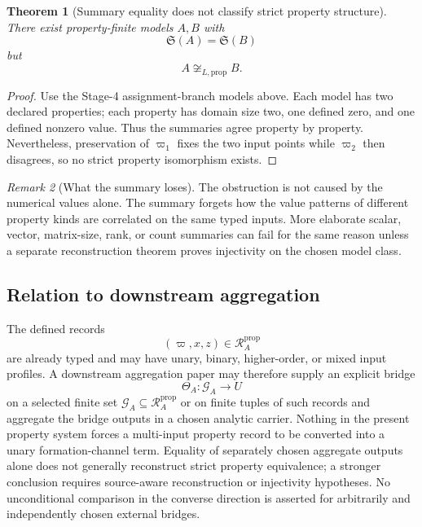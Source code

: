 \documentclass[11pt]{article}
\newcommand{\PropRec}{\mathcal R^{\mathrm{prop}}}
\newtheorem{theorem}{Theorem}[section]
\theoremstyle{definition}
\theoremstyle{remark}
\newtheorem{remark}[theorem]{Remark}
\begin{document}
\begin{theorem}[Summary equality does not classify strict property structure]
\label{thm:compression}
There exist property-finite models \(A,B\) with
\[
\mathfrak S(A)=\mathfrak S(B)
\]
but
\[
A\not\cong_{L,\mathrm{prop}}B.
\]
\end{theorem}

\begin{proof}
Use the Stage-4 assignment-branch models above.
Each model has two declared properties; each property has domain size two, one defined zero, and one defined nonzero value.
Thus the summaries agree property by property.
Nevertheless, preservation of \(\varpi_1\) fixes the two input points while \(\varpi_2\) then disagrees, so no strict property isomorphism exists.
\end{proof}

\begin{remark}[What the summary loses]
The obstruction is not caused by the numerical values alone.
The summary forgets how the value patterns of different property kinds are correlated on the same typed inputs.
More elaborate scalar, vector, matrix-size, rank, or count summaries can fail for the same reason unless a separate reconstruction theorem proves injectivity on the chosen model class.
\end{remark}

\subsection{Relation to downstream aggregation}

The defined records
\[
(\varpi,x,z)\in\PropRec_A
\]
are already typed and may have unary, binary, higher-order, or mixed input profiles.
A downstream aggregation paper may therefore supply an explicit bridge
\[
\Theta_A:\mathcal G_A\longrightarrow U
\]
on a selected finite set \(\mathcal G_A\subseteq\PropRec_A\) or on finite tuples of such records and aggregate the bridge outputs in a chosen analytic carrier.
Nothing in the present property system forces a multi-input property record to be converted into a unary formation-channel term.
Equality of separately chosen aggregate outputs alone does not generally reconstruct strict property equivalence; a stronger conclusion requires source-aware reconstruction or injectivity hypotheses.
No unconditional comparison in the converse direction is asserted for arbitrarily and independently chosen external bridges.
\end{document}
